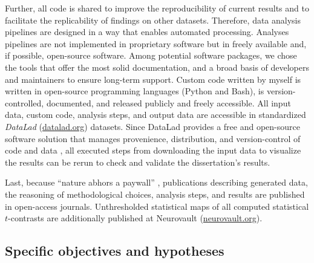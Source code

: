 Further, all code is shared to improve the reproducibility of current results
and to facilitate the replicability of findings on other datasets.
Therefore, data analysis pipelines are designed in a way that enables automated
processing.
Analyses pipelines are not implemented in proprietary software but in freely
available and, if possible, open-source software.
Among potential software packages, we chose the tools that offer the most solid
documentation, and a broad basis of developers and maintainers to ensure
long-term support.
Custom code written by myself is written in open-source programming languages
(Python and Bash), is version-controlled, documented, and released publicly and
freely accessible.
All input data, custom code, analysis steps, and output data are accessible in
standardized \textit{DataLad} (\href{www.datalad.org}{datalad.org}) datasets.
Since DataLad provides a free and open-source software solution that manages
provenience, distribution, and version-control of code and data
\citep{halchenko2021datalad}, all executed steps from downloading the input data
to visualize the results can be rerun to check and validate the dissertation's
results.

Last, because ``nature abhors a paywall'' \citep{dupre2020nature}, publications
describing generated data, the reasoning of methodological choices, analysis
steps, and results are published in open-access journals.
Unthresholded statistical maps of all computed statistical $t$-contrasts are
additionally published at Neurovault
(\href{https://neurovault.org/}{neurovault.org}).


\subsection{Specific objectives and hypotheses}



